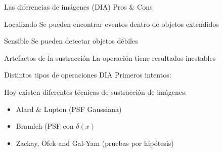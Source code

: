 \documentclass[11pt]{beamer}
\begin{document}
\begin{frame}{Las diferencias de im\'agenes (DIA)}
Pros \& Cons
   \begin{exampleblock}{Localizado}
   Se pueden encontrar eventos dentro de objetos extendidos
   \end{exampleblock}
   \pause
   \begin{exampleblock}{Sensible}
   Se pueden detectar objetos d\'ebiles
   \end{exampleblock}
   \pause
   \begin{alertblock}{Artefactos de la sustracci\'on}
   La operaci\'on tiene resultados inestables
   \end{alertblock}
   
\end{frame}

\begin{frame}{Distintos tipos de operaciones DIA}
    Primeros intentos: \cite{phillips_registering_1995}
    
    Hoy existen diferentes t\'ecnicas de sustracci\'on de im\'agenes:
    \begin{itemize}
        \item Alard \& Lupton \cite{alard_method_1998} (PSF Gaussiana)
        \item Bramich \cite{bramich_new_2008} (PSF con $\delta(x)$
        \item Zackay, Ofek and Gal-Yam \cite{zackay_proper_2016} (pruebas por hip\'otesis)
    \end{itemize}
\end{frame}
\end{document}
